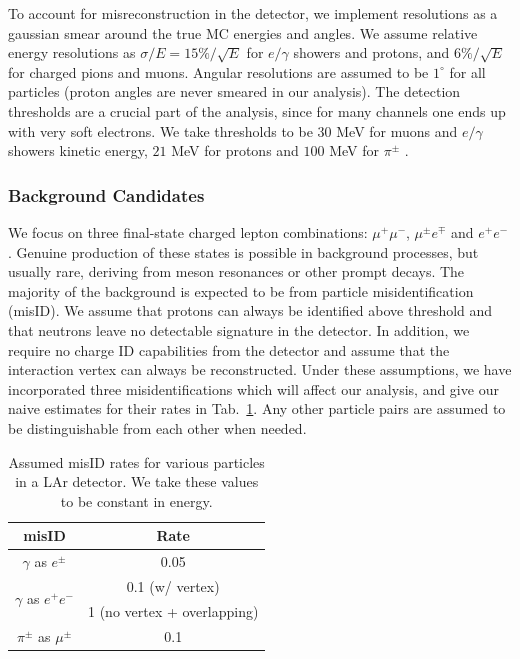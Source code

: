 To account for misreconstruction in the detector, we implement resolutions as a gaussian smear around the true MC energies and angles. We assume relative energy resolutions as $\sigma/E = 15\%/\sqrt{E}$ for $e/\gamma$ showers and protons, and $6\%/\sqrt{E}$ for charged pions and muons. Angular resolutions are assumed to be $1^\circ$ for all particles (proton angles are never smeared in our analysis). The detection thresholds are a crucial part of the analysis, since for many channels one ends up with very soft electrons. We take thresholds to be $30$ MeV for muons and $e/\gamma$ showers kinetic energy, $21$ MeV for protons and $100$ MeV for $\pi^{\pm}$ \cite{DUNECDRvolII}.

\subsubsection{Background Candidates}
\label{subsubsec:misID}
We focus on three final-state charged lepton combinations: $\mu^+\mu^-$, $\mu^\pm e^\mp$ and $e^+e^-$. Genuine production of these states is possible in background processes, but usually rare, deriving from meson resonances or other prompt decays. The majority of the background is expected to be from particle misidentification (misID). We assume that protons can always be identified above threshold and that neutrons leave no detectable signature in the detector. In addition, we require no charge ID capabilities from the detector and assume that the interaction vertex can always be reconstructed. Under these assumptions, we have incorporated three misidentifications which will affect our analysis, and give our naive estimates for their rates in Tab.~\ref{tab:misIDlist}. Any other particle pairs are assumed to be distinguishable from each other when needed.
%
\renewcommand{\arraystretch}{1.2}
\begin{table}[t]
\centering 
\begin{tabular}{|c c|}
\hline\hline
\bf misID & \bf Rate \\
\hline\hline
%
$\gamma$ as $e^\pm$ & 0.05 \\
\hline
\multirow{2}{*}{$\gamma$ as $e^+e^-$} & 0.1 (w/ vertex)  \\
 & 1 (no vertex + overlapping)  \\
\hline
$\pi^\pm$ as $\mu^\pm$ & 0.1 \\
\hline\hline
\end{tabular}
\caption{\label{tab:misIDlist} Assumed misID rates for various particles in a LAr detector. We take these values to be constant in energy.}
\end{table}


